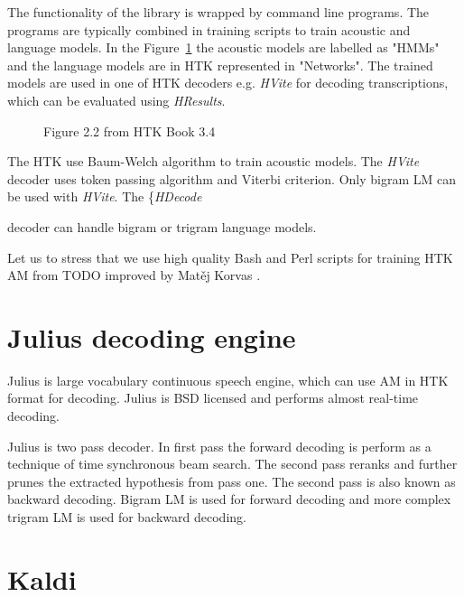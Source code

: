 {The functionality of the library is wrapped by command line programs.
The programs are typically combined in training scripts to train acoustic and language models.
In the Figure~\ref{fig:htk_tools} the acoustic models are labelled as "HMMs" 
and the language models are in \ac{HTK} represented in "Networks".
The trained models are used in one of \ac{HTK} decoders e.g. {\it HVite}\/ for decoding
transcriptions, which can be evaluated using {\it HResults}.

\begin{figure}[!htp]
    \begin{center}
    
    \caption{Figure 2.2 from HTK Book 3.4\cite{TODO_HTK_BOOK_Figure 2.2.}}
    \label{fig:htk_tools} 
    \end{center}
\end{figure}

The \ac{HTK} use Baum-Welch algorithm to train acoustic models.
The {\it HVite} decoder uses token passing algorithm and Viterbi criterion.
\cite{HTKBook3.4} %
Only bigram \ac{LM} can be used with {\it HVite}.
The \{\it HDecode} decoder can handle bigram or trigram language models. 


Let us to stress that we use high quality Bash and Perl scripts for training \ac{HTK} \ac{AM}
from TODO improved by Matěj Korvas \cite{TODO}.

\section{Julius decoding engine}
\label{sec:back_julius}

Julius is large vocabulary continuous speech engine, which can use \ac{AM} in \ac{HTK} format for decoding.\cite{JULIUS_TODO}
Julius is BSD licensed \cite{BSD_TODO} and performs almost real-time decoding.

Julius is two pass decoder. In first pass the forward decoding is perform as
a technique of time synchronous beam search.
The second pass reranks and further prunes the extracted hypothesis from pass one.
The second pass is also known as backward decoding.
Bigram \ac{LM} is used for forward decoding and more complex trigram \ac{LM} is used for backward decoding.






\section{Kaldi}
\label{sec:back_kaldi}

